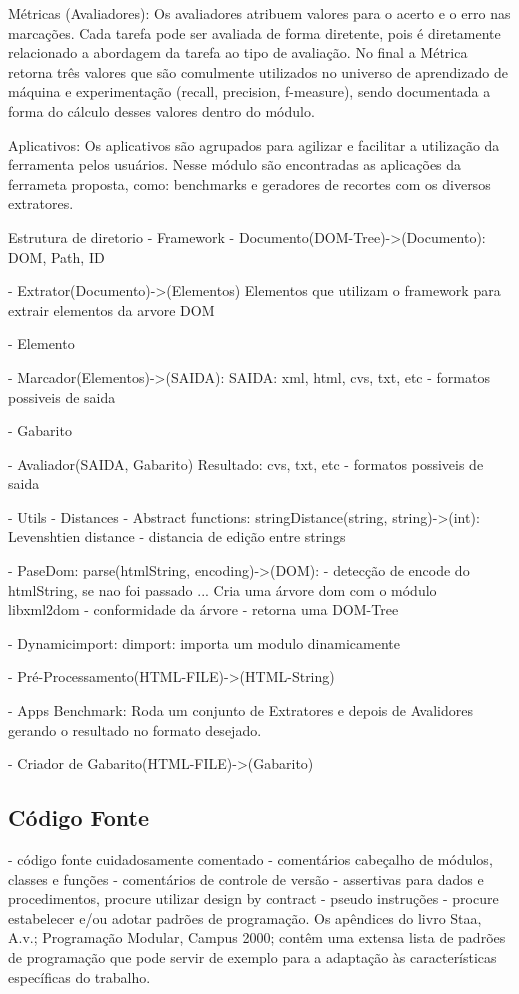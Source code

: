 \documentclass{acm_proc_article-sp}
\numberwithin{equation}{section}
\begin{document}
 Métricas (Avaliadores):
  Os avaliadores atribuem valores para o acerto e o erro nas marcações.
  Cada tarefa pode ser avaliada de forma diretente, pois é diretamente
  relacionado a abordagem da tarefa ao tipo de avaliação. No final a
  Métrica retorna três valores que são comulmente utilizados no universo
  de aprendizado de máquina e experimentação (recall, precision,
  f-measure), sendo documentada a forma do cálculo desses valores dentro
  do módulo.
 
 Aplicativos:
  Os aplicativos são agrupados para agilizar e facilitar a utilização da
  ferramenta pelos usuários. Nesse módulo são encontradas as aplicações
  da ferrameta proposta, como: benchmarks e geradores de recortes com os
  diversos extratores.


Estrutura de diretorio
- Framework 
  - Documento(DOM-Tree)->(Documento):
    DOM, Path, ID

  - Extrator(Documento)->(Elementos)
    Elementos que utilizam o framework para extrair elementos da arvore DOM

  - Elemento

  - Marcador(Elementos)->(SAIDA):
    SAIDA: xml, html, cvs, txt, etc - formatos possiveis de saida

  - Gabarito

  - Avaliador(SAIDA, Gabarito)
    Resultado: cvs, txt, etc - formatos possiveis de saida

  - Utils
    - Distances - Abstract functions:
      stringDistance(string, string)->(int):
        Levenshtien distance - distancia de edição entre strings

    - PaseDom:
      parse(htmlString, encoding)->(DOM):
        - detecção de encode do htmlString, se nao foi passado
        ...
        Cria uma árvore dom com o módulo libxml2dom
        - conformidade da árvore
        - retorna uma DOM-Tree

    - Dynamicimport:
      dimport:
        importa um modulo dinamicamente
	
    - Pré-Processamento(HTML-FILE)->(HTML-String)

  - Apps
    Benchmark:
      Roda um conjunto de Extratores e depois de Avalidores gerando o
      resultado no formato desejado.

- Criador de Gabarito(HTML-FILE)->(Gabarito)

\subsection{Código Fonte}
      - código fonte cuidadosamente comentado
                  - comentários cabeçalho de módulos, classes e funções
                  - comentários de controle de versão
                  - assertivas para dados e procedimentos, procure utilizar design     by contract
                  - pseudo instruções
                  - procure estabelecer e/ou adotar padrões de programação. Os apêndices do livro Staa, A.v.; Programação Modular, Campus 2000; contêm uma extensa lista de padrões de programação que pode servir de exemplo para a adaptação às características específicas do trabalho. 
\end{document}
